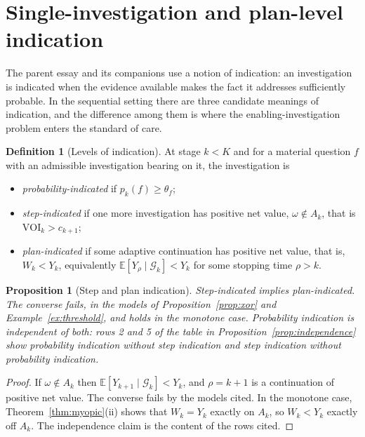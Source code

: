 \documentclass[11pt]{article}
\newcommand{\G}{\mathcal G}
\newcommand{\E}{\mathbb E}
\theoremstyle{plain}
\newtheorem{proposition}{Proposition}
\theoremstyle{definition}
\newtheorem{definition}{Definition}
\begin{document}
\section{Single-investigation and plan-level indication}\label{sec:plan}

The parent essay and its companions use a notion of indication: an investigation is indicated when the evidence available makes the fact it addresses sufficiently probable. In the sequential setting there are three candidate meanings of indication, and the difference among them is where the enabling-investigation problem enters the standard of care.

\begin{definition}[Levels of indication]\label{def:indication}
At stage $k<K$ and for a material question $f$ with an admissible investigation bearing on it, the investigation is
\begin{itemize}[nosep]
\item \emph{probability-indicated} if $p_k(f)\ge\theta_f$;
\item \emph{step-indicated} if one more investigation has positive net value, $\omega\notin A_k$, that is $\mathrm{VOI}_k>c_{k+1}$;
\item \emph{plan-indicated} if some adaptive continuation has positive net value, that is, $W_k<Y_k$, equivalently $\E[Y_\rho\mid\G_k]<Y_k$ for some stopping time $\rho>k$.
\end{itemize}
\end{definition}

\begin{proposition}[Step and plan indication]\label{prop:planindicated}
Step-indicated implies plan-indicated. The converse fails, in the models of Proposition~\ref{prop:xor} and Example~\ref{ex:threshold}, and holds in the monotone case. Probability indication is independent of both: rows 2 and 5 of the table in Proposition~\ref{prop:independence} show probability indication without step indication and step indication without probability indication.
\end{proposition}

\begin{proof}
If $\omega\notin A_k$ then $\E[Y_{k+1}\mid\G_k]<Y_k$, and $\rho=k+1$ is a continuation of positive net value. The converse fails by the models cited. In the monotone case, Theorem~\ref{thm:myopic}(ii) shows that $W_k=Y_k$ exactly on $A_k$, so $W_k<Y_k$ exactly off $A_k$. The independence claim is the content of the rows cited.
\end{proof}
\end{document}
